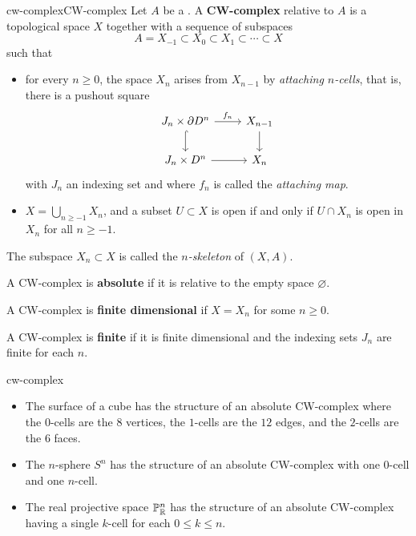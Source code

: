 \begin{topic}{cw-complex}{CW-complex}
    Let $A$ be a . A \textbf{CW-complex} relative to $A$ is a topological space $X$ together with a sequence of subspaces
    \[ A = X_{-1} \subset X_0 \subset X_1 \subset \cdots \subset X \]
    such that
    \begin{itemize}
        \item for every $n \ge 0$, the space $X_n$ arises from $X_{n - 1}$ by \textit{attaching $n$-cells}, that is, there is a pushout square
        \[ \begin{tikzcd}
            J_n \times \partial D^n \arrow{r}{f_n} \arrow[hook]{d} & X_{n - 1} \arrow{d} \\ J_n \times D^n \arrow{r} & X_n
        \end{tikzcd} \]
        with $J_n$ an indexing set and where $f_n$ is called the \textit{attaching map}.
        \item $X = \bigcup_{n \ge -1} X_n$, and a subset $U \subset X$ is open if and only if $U \cap X_n$ is open in $X_n$ for all $n \ge -1$.
    \end{itemize}
    
    The subspace $X_n \subset X$ is called the \textit{$n$-skeleton} of $(X, A)$.
    
    A CW-complex is \textbf{absolute} if it is relative to the empty space $\varnothing$.
    
    A CW-complex is \textbf{finite dimensional} if $X = X_n$ for some $n \ge 0$.
    
    A CW-complex is \textbf{finite} if it is finite dimensional and the indexing sets $J_n$ are finite for each $n$.
\end{topic}

\begin{example}{cw-complex}
    \begin{itemize}
        \item The surface of a cube has the structure of an absolute CW-complex where the $0$-cells are the $8$ vertices, the $1$-cells are the $12$ edges, and the $2$-cells are the $6$ faces.
        \item The $n$-sphere $S^n$ has the structure of an absolute CW-complex with one $0$-cell and one $n$-cell.
        \item The real projective space $\mathbb{P}_{\mathbb{R}}^n$ has the structure of an absolute CW-complex having a single $k$-cell for each $0 \le k \le n$.
\end{itemize}
\end{example}

